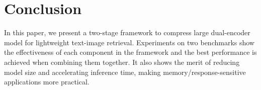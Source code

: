 \section{Conclusion}
In this paper, we present a two-stage framework to compress large dual-encoder model for lightweight text-image retrieval. Experiments on two benchmarks show the effectiveness of each component in the framework and the best performance is achieved when combining them together. It also shows the merit of reducing model size and accelerating inference time, making memory/response-sensitive applications more practical.